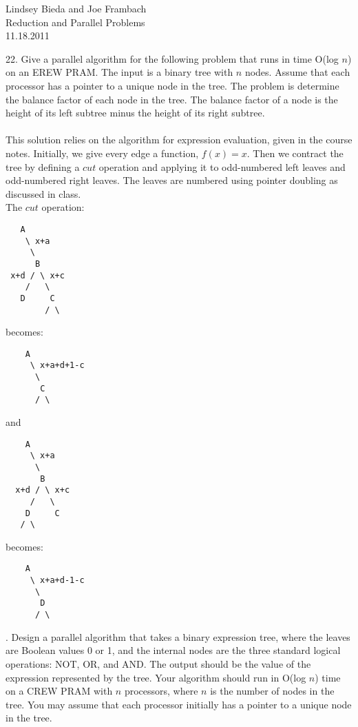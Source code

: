 \documentclass[10pt]{article}
\begin{document}
	\begin{flushright}
	Lindsey Bieda and Joe Frambach\\
	Reduction and Parallel Problems\\
	11.18.2011
	\end{flushright}


22. Give a parallel algorithm for the following problem that runs in time O(log $n$) on an EREW PRAM.
The input is a binary tree with $n$ nodes. Assume that each processor has a pointer to a unique node
in the tree. The problem is determine the balance factor of each node in the tree. The balance factor
of a node is the height of its left subtree minus the height of its right subtree.
\\
\\
This solution relies on the algorithm for expression evaluation, given in the course notes.
Initially, we give every edge a function, $f(x) = x$. Then we contract the tree by defining a $cut$
operation and applying it to odd-numbered left leaves and odd-numbered right leaves. The leaves
are numbered using pointer doubling as discussed in class.\\
The $cut$ operation:\\
\begin{verbatim}
   A
    \ x+a
     \
      B
 x+d / \ x+c
    /   \
   D     C
        / \
\end{verbatim}
becomes:
\begin{verbatim}
    A
     \ x+a+d+1-c
      \
       C
      / \
\end{verbatim}
and
\begin{verbatim}
    A
     \ x+a
      \
       B
  x+d / \ x+c
     /   \
    D     C
   / \
\end{verbatim}
becomes:
\begin{verbatim}
    A
     \ x+a+d-1-c
      \
       D
      / \
\end{verbatim}
\newpage
24. Design a parallel algorithm that takes a binary expression tree, where the leaves are Boolean values
0 or 1, and the internal nodes are the three standard logical operations: NOT, OR, and AND. The
output should be the value of the expression represented by the tree. Your algorithm should run in
O(log $n$) time on a CREW PRAM with $n$ processors, where $n$ is the number of nodes in the tree. You
may assume that each processor initially has a pointer to a unique node in the tree.
\end{document}
